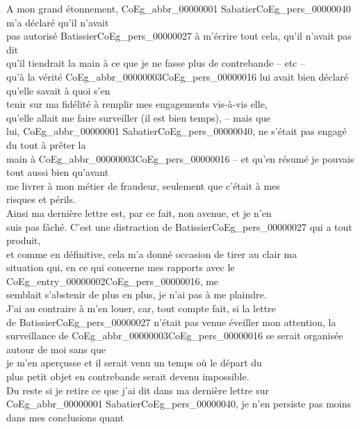 \documentclass{book}
\begin{document}
\indent A mon grand étonnement, \gls{CoEg_abbr_00000001} Sabatier\gls{CoEg_pers_00000040} m’a déclaré qu’il n’avait\\
pas autorisé Batissier\gls{CoEg_pers_00000027} à m’écrire tout cela, qu’il n’avait pas dit\\
qu’il tiendrait la main à ce que je ne fasse plus de contrebande – etc –\\
qu’à la vérité \gls{CoEg_abbr_00000003}\gls{CoEg_pers_00000016} lui avait bien déclaré qu’elle savait à quoi s’en\\
tenir sur ma fidélité à remplir mes engagements vis-à-vis elle,\\
qu’elle allait me faire surveiller (il est bien temps), – mais que\\
lui, \gls{CoEg_abbr_00000001} Sabatier\gls{CoEg_pers_00000040}, ne s’était pas engagé du tout à prêter la\\
main à \gls{CoEg_abbr_00000003}\gls{CoEg_pers_00000016} – et qu’en résumé je pouvais tout aussi bien qu’avant\\
me livrer à mon métier de fraudeur, seulement que c’était à mes\\
risques et périls.\\
\indent Ainsi ma dernière lettre est, par ce fait, non avenue, et je n’en\\
suis pas fâché. C’est une distraction de Batissier\gls{CoEg_pers_00000027} qui a tout produit,\\
et comme en définitive, cela m’a donné occasion de tirer au clair ma\\
situation qui, en ce qui concerne mes rapports avec le \Gls{CoEg_entry_00000002}\gls{CoEg_pers_00000016}, me\\
semblait s’abstenir de plus en plus, je n’ai pas à me plaindre.\\
J’ai au contraire à m’en louer, car, tout compte fait, si la lettre\\
de Batissier\gls{CoEg_pers_00000027} n’était pas venue éveiller mon attention, la\\
surveillance de \gls{CoEg_abbr_00000003}\gls{CoEg_pers_00000016} se serait organisée autour de moi sans que\\
je m’en aperçusse et il serait venu un temps où le départ du\\
plus petit objet en contrebande serait devenu impossible.\\
\indent Du reste si je retire ce que j’ai dit dans ma dernière lettre sur\\
\gls{CoEg_abbr_00000001} Sabatier\gls{CoEg_pers_00000040}, je n’en persiste pas moins dans mes conclusions quant\\
\end{document}
